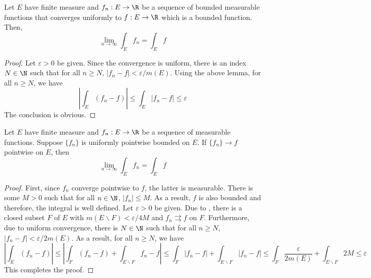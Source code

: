 \begin{proposition}
    Let $E$ have finite measure and $f_n: E\to\R$ be a sequence of bounded measurable functions that converges uniformly to $f: E\to\R$ which is a bounded function. Then, 
    \begin{equation*}
        \lim_{n\to\infty}\int_E f_n = \int_E f
    \end{equation*}
\end{proposition}
\begin{proof}
    Let $\varepsilon > 0$ be given. Since the convergence is uniform, there is an index $N\in\N$ such that for all $n\ge N$, $|f_n - f| < \varepsilon/m(E)$. Using the above lemma, for all $n\ge N$, we have 
    \begin{equation*}
        \left|\int_E(f_n - f)\right|\le\int_E|f_n - f|\le\varepsilon
    \end{equation*}
    The conclusion is obvious.
\end{proof}

\begin{theorem}
    Let $E$ have finite measure and $f_n:E\to\R$ be a sequence of measurable functions. Suppose $\{f_n\}$ is uniformly pointwise bounded on $E$. If $\{f_n\}\to f$ pointwise on $E$, then 
    \begin{equation*}
        \lim_{n\to\infty}\int_E f_n = \int_E f
    \end{equation*}
\end{theorem}
\begin{proof}
    First, since $f_n$ converge pointwise to $f$, the latter is measurable. There is some $M > 0$ such that for all $n\in\N$, $|f_n|\le M$. As a result, $f$ is also bounded and therefore, the integral is well defined. Let $\varepsilon > 0$ be given. Due to , there is a closed subset $F$ of $E$ with $m(E\backslash F) < \varepsilon/4M$ and $f_n\rightrightarrows f$ on $F$. Furthermore, due to uniform convergence, there is $N\in\N$ such that for all $n\ge N$, $|f_n - f| < \varepsilon/2m(E)$. As a result, for all $n\ge N$, we have 
    \begin{equation*}
        \left|\int_E (f_n - f)\right|\le\left|\int_F(f_n - f) + \int_{E\backslash F} f_n - f\right|\le\int_F|f_n - f| + \int_{E\backslash F}|f_n - f|\le\int_F\frac{\varepsilon}{2m(E)} + \int_{E\backslash F}2M\le\varepsilon
    \end{equation*}
    This completes the proof.
\end{proof}

